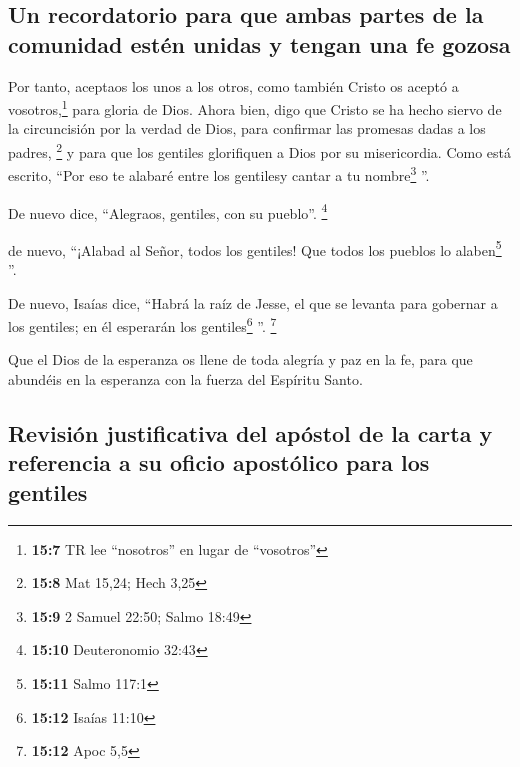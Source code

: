 \hypertarget{un-recordatorio-para-que-ambas-partes-de-la-comunidad-estuxe9n-unidas-y-tengan-una-fe-gozosa}{%
\subsection{Un recordatorio para que ambas partes de la comunidad estén
unidas y tengan una fe
gozosa}\label{un-recordatorio-para-que-ambas-partes-de-la-comunidad-estuxe9n-unidas-y-tengan-una-fe-gozosa}}

 Por tanto, aceptaos los unos a los otros, como también
Cristo os aceptó a vosotros,\footnote{\textbf{15:7} TR lee ``nosotros''
  en lugar de ``vosotros''} para gloria de Dios.  Ahora
bien, digo que Cristo se ha hecho siervo de la circuncisión por la
verdad de Dios, para confirmar las promesas dadas a los padres,
\footnote{\textbf{15:8} Mat 15,24; Hech 3,25}  y para que
los gentiles glorifiquen a Dios por su misericordia. Como está escrito,
``Por eso te alabaré entre los gentilesy cantar a tu nombre\footnote{\textbf{15:9}
  2 Samuel 22:50; Salmo 18:49} ''.

 De nuevo dice, ``Alegraos, gentiles, con su pueblo''.
\footnote{\textbf{15:10} Deuteronomio 32:43}

 de nuevo, ``¡Alabad al Señor, todos los gentiles! Que
todos los pueblos lo alaben\footnote{\textbf{15:11} Salmo 117:1} ''.

 De nuevo, Isaías dice, ``Habrá la raíz de Jesse, el que
se levanta para gobernar a los gentiles; en él esperarán los
gentiles\footnote{\textbf{15:12} Isaías 11:10} ''. \footnote{\textbf{15:12}
  Apoc 5,5}

 Que el Dios de la esperanza os llene de toda alegría y
paz en la fe, para que abundéis en la esperanza con la fuerza del
Espíritu Santo.

\hypertarget{revisiuxf3n-justificativa-del-apuxf3stol-de-la-carta-y-referencia-a-su-oficio-apostuxf3lico-para-los-gentiles}{%
\subsection{Revisión justificativa del apóstol de la carta y referencia
a su oficio apostólico para los
gentiles}\label{revisiuxf3n-justificativa-del-apuxf3stol-de-la-carta-y-referencia-a-su-oficio-apostuxf3lico-para-los-gentiles}}

